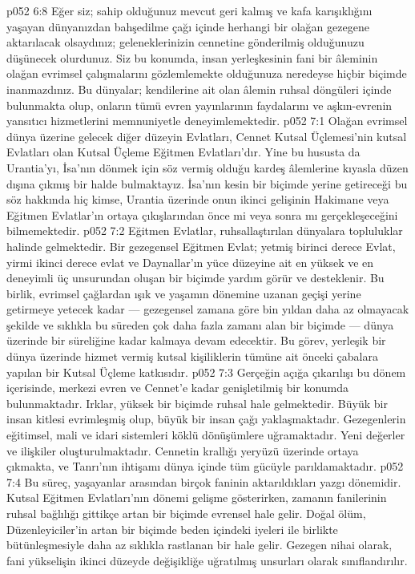 \vs p052 6:8 Eğer siz; sahip olduğunuz mevcut geri kalmış ve kafa karışıklığını yaşayan dünyanızdan bahşedilme çağı içinde herhangi bir olağan gezegene aktarılacak olsaydınız; geleneklerinizin cennetine gönderilmiş olduğunuzu düşünecek olurdunuz. Siz bu konumda, insan yerleşkesinin fani bir âleminin olağan evrimsel çalışmalarını gözlemlemekte olduğunuza neredeyse hiçbir biçimde inanmazdınız. Bu dünyalar; kendilerine ait olan âlemin ruhsal döngüleri içinde bulunmakta olup, onların tümü evren yayınlarının faydalarını ve aşkın\hyp{}evrenin yansıtıcı hizmetlerini memnuniyetle deneyimlemektedir.
\vs p052 7:1 Olağan evrimsel dünya üzerine gelecek diğer düzeyin Evlatları, Cennet Kutsal Üçlemesi’nin kutsal Evlatları olan Kutsal Üçleme Eğitmen Evlatları’dır. Yine bu hususta da Urantia’yı, İsa’nın dönmek için söz vermiş olduğu kardeş âlemlerine kıyasla düzen dışına çıkmış bir halde bulmaktayız. İsa’nın kesin bir biçimde yerine getireceği bu söz hakkında hiç kimse, Urantia üzerinde onun ikinci gelişinin Hakimane veya Eğitmen Evlatlar’ın ortaya çıkışlarından önce mi veya sonra mı gerçekleşeceğini bilmemektedir.
\vs p052 7:2 Eğitmen Evlatlar, ruhsallaştırılan dünyalara topluluklar halinde gelmektedir. Bir gezegensel Eğitmen Evlat; yetmiş birinci derece Evlat, yirmi ikinci derece evlat ve Daynallar’ın yüce düzeyine ait en yüksek ve en deneyimli üç unsurundan oluşan bir biçimde yardım görür ve desteklenir. Bu birlik, evrimsel çağlardan ışık ve yaşamın dönemine uzanan geçişi yerine getirmeye yetecek kadar --- gezegensel zamana göre bin yıldan daha az olmayacak şekilde ve sıklıkla bu süreden çok daha fazla zamanı alan bir biçimde --- dünya üzerinde bir süreliğine kadar kalmaya devam edecektir. Bu görev, yerleşik bir dünya üzerinde hizmet vermiş kutsal kişiliklerin tümüne ait önceki çabalara yapılan bir Kutsal Üçleme katkısıdır.
\vs p052 7:3 Gerçeğin açığa çıkarılışı bu dönem içerisinde, merkezi evren ve Cennet’e kadar genişletilmiş bir konumda bulunmaktadır. Irklar, yüksek bir biçimde ruhsal hale gelmektedir. Büyük bir insan kitlesi evrimleşmiş olup, büyük bir insan çağı yaklaşmaktadır. Gezegenlerin eğitimsel, mali ve idari sistemleri köklü dönüşümlere uğramaktadır. Yeni değerler ve ilişkiler oluşturulmaktadır. Cennetin krallığı yeryüzü üzerinde ortaya çıkmakta, ve Tanrı’nın ihtişamı dünya içinde tüm gücüyle parıldamaktadır.
\vs p052 7:4 Bu süreç, yaşayanlar arasından birçok faninin aktarıldıkları yazgı dönemidir. Kutsal Eğitmen Evlatları’nın dönemi gelişme gösterirken, zamanın fanilerinin ruhsal bağlılığı gittikçe artan bir biçimde evrensel hale gelir. Doğal ölüm, Düzenleyiciler’in artan bir biçimde beden içindeki iyeleri ile birlikte bütünleşmesiyle daha az sıklıkla rastlanan bir hale gelir. Gezegen nihai olarak, fani yükselişin ikinci düzeyde değişikliğe uğratılmış unsurları olarak sınıflandırılır.
